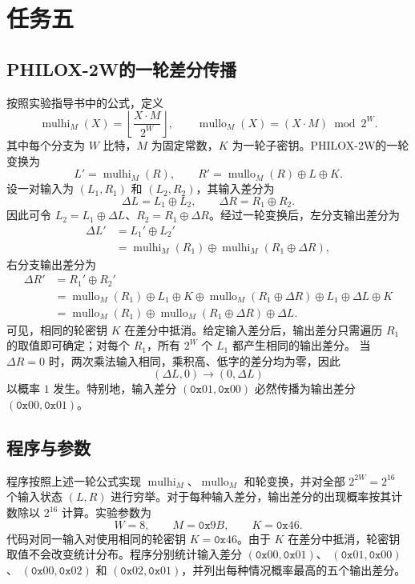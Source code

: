 \section{任务五}

\subsection{PHILOX-2W的一轮差分传播}
按照实验指导书中的公式，定义
\[
    \operatorname{mulhi}_M(X)
    =\left\lfloor\frac{X\cdot M}{2^W}\right\rfloor,
    \qquad
    \operatorname{mullo}_M(X)
    =(X\cdot M)\bmod 2^W.
\]
其中每个分支为 $W$ 比特，$M$ 为固定常数，$K$ 为一轮子密钥。PHILOX-2W的一轮变换为
\[
    L'=\operatorname{mulhi}_M(R),
    \qquad
    R'=\operatorname{mullo}_M(R)\oplus L\oplus K.
\]
设一对输入为 $(L_1,R_1)$ 和 $(L_2,R_2)$，其输入差分为
\[
    \Delta L=L_1\oplus L_2,
    \qquad
    \Delta R=R_1\oplus R_2.
\]
因此可令 $L_2=L_1\oplus\Delta L$、$R_2=R_1\oplus\Delta R$。经过一轮变换后，左分支输出差分为
\[
\begin{aligned}
    \Delta L'
    &=L_1'\oplus L_2'\\
    &=\operatorname{mulhi}_M(R_1)
      \oplus\operatorname{mulhi}_M(R_1\oplus\Delta R),
\end{aligned}
\]
右分支输出差分为
\[
\begin{aligned}
    \Delta R'
    &=R_1'\oplus R_2'\\
    &=\operatorname{mullo}_M(R_1)\oplus L_1\oplus K \oplus\operatorname{mullo}_M(R_1\oplus\Delta R)
      \oplus L_1\oplus\Delta L\oplus K\\
    &=\operatorname{mullo}_M(R_1)
      \oplus\operatorname{mullo}_M(R_1\oplus\Delta R)
      \oplus\Delta L.
\end{aligned}
\]
可见，相同的轮密钥 $K$ 在差分中抵消。给定输入差分后，输出差分只需遍历 $R_1$ 的取值即可确定；对每个 $R_1$，所有 $2^W$ 个 $L_1$ 都产生相同的输出差分。
当 $\Delta R=0$ 时，两次乘法输入相同，乘积高、低字的差分均为零，因此
\[
    (\Delta L,0)\longrightarrow(0,\Delta L)
\]
以概率 $1$ 发生。特别地，输入差分 $(\texttt{0x}01,\texttt{0x}00)$ 必然传播为输出差分 $(\texttt{0x}00,\texttt{0x}01)$。

\subsection{程序与参数}

程序按照上述一轮公式实现 $\operatorname{mulhi}_M$、$\operatorname{mullo}_M$ 和轮变换，并对全部 $2^{2W}=2^{16}$ 个输入状态 $(L,R)$ 进行穷举。对于每种输入差分，输出差分的出现概率按其计数除以 $2^{16}$ 计算。实验参数为
\[
    W=8,\qquad M=\texttt{0x}9B,\qquad K=\texttt{0x}46.
\]
代码对同一输入对使用相同的轮密钥 $K=\texttt{0x}46$。由于 $K$ 在差分中抵消，轮密钥取值不会改变统计分布。程序分别统计输入差分
$(\texttt{0x}00,\texttt{0x}01)$、
$(\texttt{0x}01,\texttt{0x}00)$、
$(\texttt{0x}00,\texttt{0x}02)$ 和
$(\texttt{0x}02,\texttt{0x}01)$，并列出每种情况概率最高的五个输出差分。
